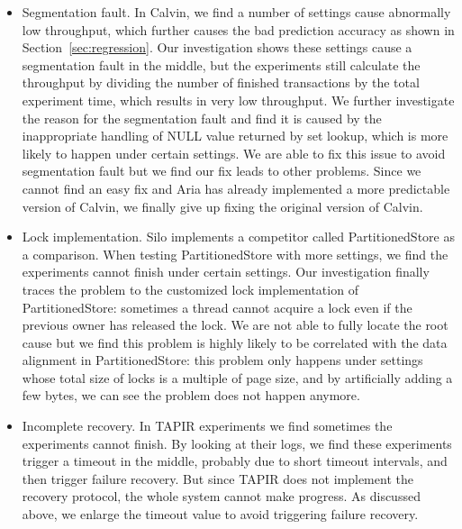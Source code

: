 \begin{itemize} [leftmargin=*]

    \vspace{-.05in}
    \item Segmentation fault. In Calvin, we find a number of settings cause
    abnormally low throughput, which further causes the bad prediction accuracy as
    shown in Section~\ref{sec:regression}. Our investigation shows these settings cause
    a segmentation fault in the middle, but the experiments still calculate the throughput
    by dividing the number of finished transactions by the total experiment time, which
    results in very low throughput. We further investigate the reason for the segmentation
    fault and find it is caused by the inappropriate handling of NULL value returned
    by set lookup, which is more likely to happen under certain settings. We are able
    to fix this issue to avoid segmentation fault but we find our fix leads to other problems.
    Since we cannot find an easy fix and Aria has already implemented a more predictable version of Calvin,
    we finally give up fixing the original version of Calvin.

    \vspace{-.05in}
   \item Lock implementation. Silo implements a competitor called PartitionedStore as
    a comparison. When testing PartitionedStore with more settings, we find the experiments
    cannot finish under certain settings. Our investigation finally traces the problem to the
    customized lock implementation of PartitionedStore: sometimes a thread cannot acquire a lock even if the
    previous owner has released the lock. We are not able to fully locate the root cause but
    we find this problem is highly likely to be correlated with the data alignment in PartitionedStore:
    this problem only happens under settings whose total size of locks is a multiple of page size,
    and by artificially adding a few bytes, we can see the problem does not happen anymore.

	\vspace{-.05in}
    \item Incomplete recovery. In TAPIR experiments we find sometimes the experiments cannot finish.
    By looking at their logs, we find these experiments trigger a timeout in the middle, probably
    due to short timeout intervals, and then trigger failure recovery. But since TAPIR does not implement
    the recovery protocol, the whole system cannot make progress. As discussed above, we enlarge the
    timeout value to avoid triggering failure recovery.
    
\end{itemize}

